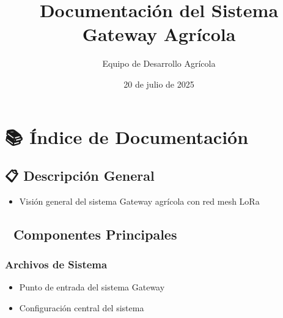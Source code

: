 \documentclass[a4paper,11pt,spanish]{sphinxmanual}
\title{Documentación del Sistema Gateway Agrícola}
\date{20 de julio de 2025}
\author{Equipo de Desarrollo Agrícola}
\begin{document}
\pagestyle{empty}
\sphinxmaketitle
\pagestyle{plain}
\sphinxtableofcontents
\pagestyle{normal}
\label{\detokenize{index::doc}}



\chapter{📚 Índice de Documentación}
\label{\detokenize{index:indice-de-documentacion}}

\section{📋 Descripción General}
\label{\detokenize{index:descripcion-general}}\begin{itemize}
\item {} 
\sphinxAtStartPar
{} \sphinxhyphen{} Visión general del sistema Gateway agrícola con red mesh LoRa

\end{itemize}


\section{🔧 Componentes Principales}
\label{\detokenize{index:componentes-principales}}

\subsection{Archivos de Sistema}
\label{\detokenize{index:archivos-de-sistema}}\begin{itemize}
\item {} 
\sphinxAtStartPar
{} \sphinxhyphen{} Punto de entrada del sistema Gateway

\item {} 
\sphinxAtStartPar
{} \sphinxhyphen{} Configuración central del sistema

\end{itemize}
\end{document}
